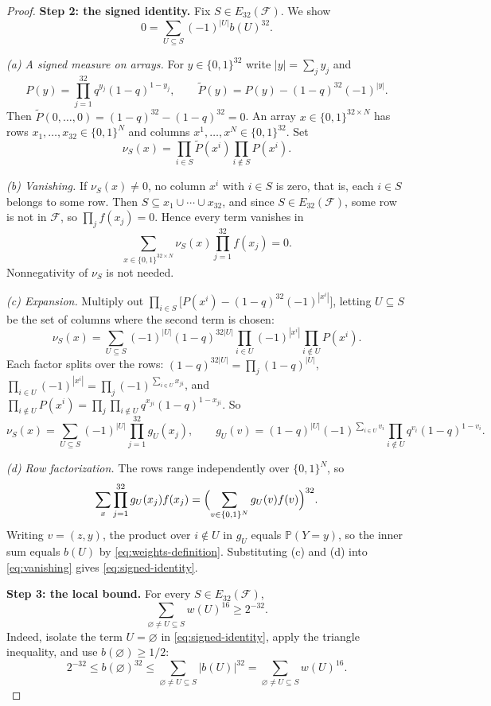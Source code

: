 \documentclass[11pt,letterpaper]{article}
\theoremstyle{definition}
\theoremstyle{remark}
\numberwithin{equation}{section}
\begin{document}
\begin{proof}
\medskip\noindent\textbf{Step 2: the signed identity.} Fix $S\in E_{32}(\mathcal F)$. We show
\begin{equation}\label{eq:signed-identity}
 0=\sum_{U\subseteq S}(-1)^{|U|}b(U)^{32}.
\end{equation}

\emph{(a) A signed measure on arrays.} For $y\in\{0,1\}^{32}$ write $|y|=\sum_jy_j$ and
\[
 P(y)=\prod_{j=1}^{32}q^{y_j}(1-q)^{1-y_j},
 \qquad
 \widetilde P(y)=P(y)-(1-q)^{32}(-1)^{|y|}.
\]
Then $\widetilde P(0,\ldots,0)=(1-q)^{32}-(1-q)^{32}=0$. An array $x\in\{0,1\}^{32\times N}$ has rows $x_1,\ldots,x_{32}\in\{0,1\}^N$ and columns $x^1,\ldots,x^N\in\{0,1\}^{32}$. Set
\[
\nu_S(x)=\prod_{i\in S}\widetilde P(x^i)\prod_{i\notin S}P(x^i).
\]

\emph{(b) Vanishing.} If $\nu_S(x)\ne0$, no column $x^i$ with $i\in S$ is zero, that is, each $i\in S$ belongs to some row. Then $S\subseteq x_1\cup\cdots\cup x_{32}$, and since $S\in E_{32}(\mathcal F)$, some row is not in $\mathcal F$, so $\prod_jf(x_j)=0$. Hence every term vanishes in
\begin{equation}\label{eq:vanishing}
 \sum_{x\in\{0,1\}^{32\times N}}\nu_S(x)
 \prod_{j=1}^{32}f(x_j)=0.
\end{equation}
Nonnegativity of $\nu_S$ is not needed.

\emph{(c) Expansion.} Multiply out $\prod_{i\in S}\bigl[P(x^i)-(1-q)^{32}(-1)^{|x^i|}\bigr]$, letting $U\subseteq S$ be the set of columns where the second term is chosen:
\[
\nu_S(x)=\sum_{U\subseteq S}(-1)^{|U|}(1-q)^{32|U|}
\prod_{i\in U}(-1)^{|x^i|}\prod_{i\notin U}P(x^i).
\]
Each factor splits over the rows: $(1-q)^{32|U|}=\prod_j(1-q)^{|U|}$, $\prod_{i\in U}(-1)^{|x^i|}=\prod_j(-1)^{\sum_{i\in U}x_{ji}}$, and $\prod_{i\notin U}P(x^i)=\prod_j\prod_{i\notin U}q^{x_{ji}}(1-q)^{1-x_{ji}}$. So
\[
\nu_S(x)=\sum_{U\subseteq S}(-1)^{|U|}\prod_{j=1}^{32}g_U(x_j),
\qquad
g_U(v)=(1-q)^{|U|}(-1)^{\sum_{i\in U}v_i}\prod_{i\notin U}q^{v_i}(1-q)^{1-v_i}.
\]

\emph{(d) Row factorization.} The rows range independently over $\{0,1\}^N$, so
\[
\sum_x\prod_{j=1}^{32}g_U(x_j)f(x_j)=\Bigl(\sum_{v\in\{0,1\}^N}g_U(v)f(v)\Bigr)^{32}.
\]
Writing $v=(z,y)$, the product over $i\notin U$ in $g_U$ equals $\mathbb P(Y=y)$, so the inner sum equals $b(U)$ by \eqref{eq:weights-definition}. Substituting (c) and (d) into \eqref{eq:vanishing} gives \eqref{eq:signed-identity}.

\medskip\noindent\textbf{Step 3: the local bound.} For every $S\in E_{32}(\mathcal F)$,
\begin{equation}\label{eq:exceptional-weight-bound}
 \sum_{\varnothing\ne U\subseteq S}w(U)^{16}\ge2^{-32}.
\end{equation}
Indeed, isolate the term $U=\varnothing$ in \eqref{eq:signed-identity}, apply the triangle inequality, and use $b(\varnothing)\ge1/2$:
\[
 2^{-32}\le b(\varnothing)^{32}
 \le\sum_{\varnothing\ne U\subseteq S}|b(U)|^{32}
 =\sum_{\varnothing\ne U\subseteq S}w(U)^{16}.
\]


\end{proof}
\end{document}
